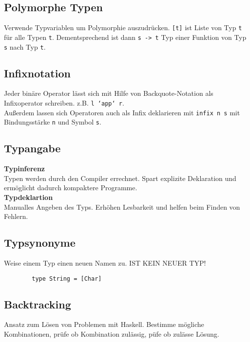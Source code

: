 \documentclass[10pt,a4paper]{article}
\def\code#1{\texttt{#1}}
\begin{document}
        \subsection{Polymorphe Typen}
        Verwende Typvariablen um Polymorphie auszudrücken.
        \code{[t]} ist Liste von Typ \code{t} für alle Typen \code{t}.
        Dementsprechend ist dann \code{s -> t} Typ einer Funktion von Typ \code{s} nach Typ \code{t}.

        \subsection{Infixnotation}
        Jeder binäre Operator lässt sich mit Hilfe von Backquote-Notation als Infixoperator schreiben.
        z.B. \code{l `app` r}.\\
        Außerdem lassen sich Operatoren auch als Infix deklarieren mit \code{infix n s} mit Bindungsstärke \code{n} und Symbol \code{s}.

        \subsection{Typangabe}
        \textbf{Typinferenz}\\
        Typen werden durch den Compiler errechnet. Spart explizite Deklaration und ermöglicht dadurch kompaktere Programme.\\
        \textbf{Typdeklartion}\\
        Manualles Angeben des Typs. Erhöhen Lesbarkeit und helfen beim Finden von Fehlern.

        \subsection{Typsynonyme}
        Weise einem Typ einen neuen Namen zu. IST KEIN NEUER TYP!
        \begin{lstlisting}
        type String = [Char]
       \end{lstlisting}

        \subsection{Backtracking}
        Ansatz zum Lösen von Problemen mit Haskell.
        Bestimme mögliche Kombinationen, prüfe ob Kombination zulässig, püfe ob zulässe Lösung.
        
        
\end{document}
